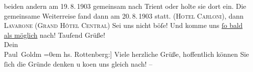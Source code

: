 \begin{ledgroupsized}[t]{13cm}
{{{                  beiden andern am 19. 8. 1903 gemeinsam nach Trient
                  oder holte sie dort ein. Die gemeinsame Weiterreise fand dann am 20. 8. 1903
                  statt.}}}\label{K_L03384-3h} (\textsc{Hotel Carloni}), dann \textsc{Lavarone} (\textsc{Grand Hôtel Central})\pend
           \pstart
           {\pb}Sei uns nicht böſe! Und komme uns \uline{ſo bald als möglich} nach!\pend
           \pstart
           Tauſend Grüße! {\\[\baselineskip]}Dein {\\[\baselineskip]}\spacefill\mbox{Paul Goldm}\pend
           \leftskip=0em{}\pstart
           \noindent{}{[}hs. Rottenberg:{]} Viele herzliche Grüße, hoffentlich können Sie ſich
                  die Gründe denken u ko{\geminationm}en uns gleich nach! –\pend
           
         
         \endnumbering{}\end{ledgroupsized}\begin{anhang}\end{anhang}\newcommand{\dateiname}{L03384}\newcommand{\titel}{Paul Goldmann und Theodore Rottenberg an Arthur Schnitzler, 18. 8. [1903]}\newcommand{\editorInnen}{Martin Anton Müller und Laura Untner}
      